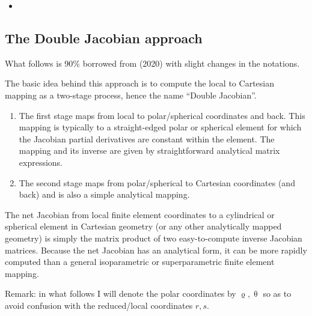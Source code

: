 \vspace{1cm}

\Literature 
\begin{itemize}
\item {}
\end{itemize}

\subsection{The Double Jacobian approach}

What follows is 90\% borrowed from \textcite{moth20} (2020) with slight changes in the notations.

The basic idea behind this approach is to compute the local to Cartesian mapping as a two-stage process, hence the name ``Double Jacobian''. 

\begin{enumerate}
\item 
The first stage maps from local to polar/spherical coordinates and back. This mapping is typically 
to a straight-edged polar or spherical element for which the Jacobian partial derivatives are constant within the element. The mapping and its inverse are given by straightforward analytical matrix expressions. 
\item The second stage maps from polar/spherical to Cartesian coordinates (and back) and is also a simple analytical mapping. 
\end{enumerate}
The net Jacobian from local finite element coordinates to a cylindrical or spherical element in Cartesian geometry (or any other analytically mapped geometry) is simply the matrix product of two easy-to-compute inverse Jacobian matrices. Because the net Jacobian has an analytical form, it can be more rapidly computed than a general isoparametric or superparametric finite
element mapping.

Remark: in what follows I will denote the polar coordinates by $\upvarrho,\uptheta$ so as to avoid confusion with the reduced/local coordinates $r,s$.


